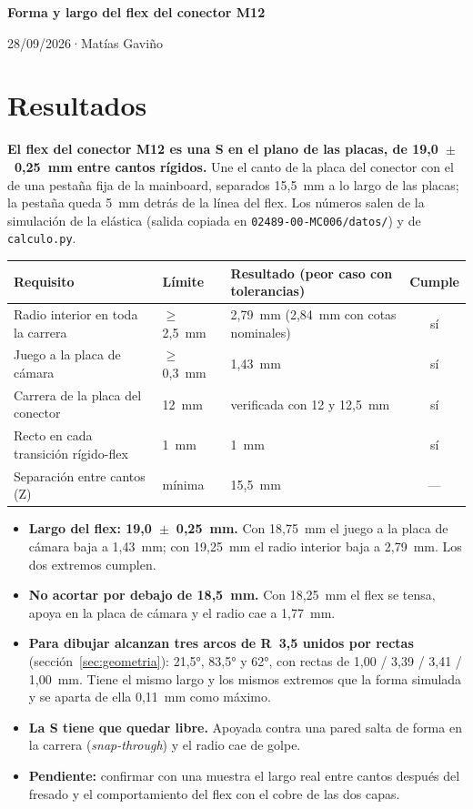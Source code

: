 \documentclass[11pt,a4paper]{article}
\newcommand{\titulo}{Forma y largo del flex del conector M12}
\newcommand{\autor}{Matías Gaviño}
\newcommand{\fecha}{28/09/2026}                    %
\newcommand{\cabecera}{%
  \thispagestyle{fancy}%
  {\fontsize{20}{24}\selectfont\bfseries\titulo\par}%
  \vspace{5pt}%
  {\small\color{gris-medio}\fecha\quad·\quad\autor\par}%
  \vspace{6pt}}
\begin{document}
\cabecera

\section{Resultados}
\textbf{El flex del conector M12 es una S en el plano de las placas, de 19,0~$\pm$~0,25~mm entre cantos
rígidos.} Une el canto de la placa del conector con el de una pestaña fija de la mainboard, separados
15,5~mm a lo largo de las placas; la pestaña queda 5~mm detrás de la línea del flex. Los números salen de la simulación
de la elástica (salida copiada en \texttt{02489-00-MC006/datos/}) y de \texttt{calculo.py}.

\begin{table}[H]\centering\small
\begin{tabular}{l l l c}
\toprule
Requisito & Límite & Resultado (peor caso con tolerancias) & Cumple\\
\midrule
Radio interior en toda la carrera & $\geq$ 2,5~mm & 2,79~mm (2,84~mm con cotas nominales) & sí\\
Juego a la placa de cámara & $\geq$ 0,3~mm & 1,43~mm & sí\\
Carrera de la placa del conector & 12~mm & verificada con 12 y 12,5~mm & sí\\
Recto en cada transición rígido-flex & 1~mm & 1~mm & sí\\
Separación entre cantos (Z) & mínima & 15,5~mm & ---\\
\bottomrule
\end{tabular}
\end{table}

\begin{itemize}
  \item \textbf{Largo del flex: 19,0~$\pm$~0,25~mm.} Con 18,75~mm el juego a la placa de cámara baja a
        1,43~mm; con 19,25~mm el radio interior baja a 2,79~mm. Los dos extremos cumplen.
  \item \textbf{No acortar por debajo de 18,5~mm.} Con 18,25~mm el flex se tensa, apoya en la placa de
        cámara y el radio cae a 1,77~mm.
  \item \textbf{Para dibujar alcanzan tres arcos de R~3,5 unidos por rectas} (sección~\ref{sec:geometria}):
        21,5°, 83,5° y 62°, con rectas de 1,00 / 3,39 / 3,41 / 1,00~mm. Tiene el mismo largo y los
        mismos extremos que la forma simulada y se aparta de ella 0,11~mm como máximo.
  \item \textbf{La S tiene que quedar libre.} Apoyada contra una pared salta de forma en la carrera
        (\emph{snap-through}) y el radio cae de golpe.
  \item \textbf{Pendiente:} confirmar con una muestra el largo real entre cantos después del fresado y el
        comportamiento del flex con el cobre de las dos capas.
\end{itemize}
\end{document}
